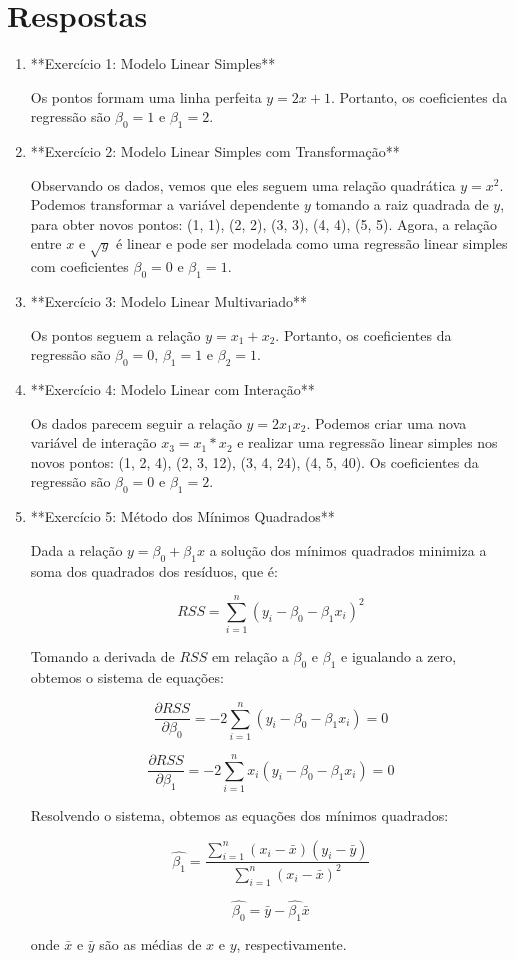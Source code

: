 \documentclass[12pt,a4paper, brazil]{article}
\begin{document}
\section{Respostas}

\begin{enumerate}
\item **Exercício 1: Modelo Linear Simples**

Os pontos formam uma linha perfeita $y = 2x + 1$. Portanto, os coeficientes da regressão são $\beta_0 = 1$ e $\beta_1 = 2$.

\item **Exercício 2: Modelo Linear Simples com Transformação**

Observando os dados, vemos que eles seguem uma relação quadrática $y = x^2$. Podemos transformar a variável dependente $y$ tomando a raiz quadrada de $y$, para obter novos pontos: (1, 1), (2, 2), (3, 3), (4, 4), (5, 5). Agora, a relação entre $x$ e $\sqrt{y}$ é linear e pode ser modelada como uma regressão linear simples com coeficientes $\beta_0 = 0$ e $\beta_1 = 1$.

\item **Exercício 3: Modelo Linear Multivariado**

Os pontos seguem a relação $y = x_1 + x_2$. Portanto, os coeficientes da regressão são $\beta_0 = 0$, $\beta_1 = 1$ e $\beta_2 = 1$.

\item **Exercício 4: Modelo Linear com Interação**

Os dados parecem seguir a relação $y = 2x_1x_2$. Podemos criar uma nova variável de interação $x_3 = x_1 * x_2$ e realizar uma regressão linear simples nos novos pontos: (1, 2, 4), (2, 3, 12), (3, 4, 24), (4, 5, 40). Os coeficientes da regressão são $\beta_0 = 0$ e $\beta_1 = 2$.

\item **Exercício 5: Método dos Mínimos Quadrados**

Dada a relação $y = \beta_0 + \beta_1x$ a solução dos mínimos quadrados minimiza a soma dos quadrados dos resíduos, que é:

$$
RSS = \sum_{i=1}^n (y_i - \beta_0 - \beta_1x_i)^2
$$

Tomando a derivada de $RSS$ em relação a $\beta_0$ e $\beta_1$ e igualando a zero, obtemos o sistema de equações:

$$
\frac{\partial RSS}{\partial \beta_0} = -2\sum_{i=1}^n (y_i - \beta_0 - \beta_1x_i) = 0
$$

$$
\frac{\partial RSS}{\partial \beta_1} = -2\sum_{i=1}^n x_i(y_i - \beta_0 - \beta_1x_i) = 0
$$

Resolvendo o sistema, obtemos as equações dos mínimos quadrados:

$$
\hat{\beta_1} = \frac{\sum_{i=1}^n (x_i - \bar{x})(y_i - \bar{y})}{\sum_{i=1}^n (x_i - \bar{x})^2}
$$

$$
\hat{\beta_0} = \bar{y} - \hat{\beta_1}\bar{x}
$$

onde $\bar{x}$ e $\bar{y}$ são as médias de $x$ e $y$, respectivamente.

\end{enumerate}
\end{document}
